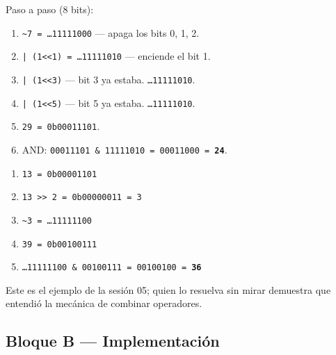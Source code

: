 \documentclass[12pt, oneside]{article}
\begin{document}
\begin{notaprofesor}
  Paso a paso (8 bits):
  \begin{enumerate}
    \item \texttt{\textasciitilde 7 = \ldots11111000} — apaga los bits 0, 1, 2.
    \item \texttt{| (1<<1) = \ldots11111010} — enciende el bit 1.
    \item \texttt{| (1<<3)} — bit 3 ya estaba. \texttt{\ldots11111010}.
    \item \texttt{| (1<<5)} — bit 5 ya estaba. \texttt{\ldots11111010}.
    \item \texttt{29 = 0b00011101}.
    \item AND: \texttt{00011101 \& 11111010 = 00011000 = \textbf{24}}.
  \end{enumerate}
\end{notaprofesor}

\begin{notaprofesor}
  \begin{enumerate}
    \item \texttt{13 = 0b00001101}
    \item \texttt{13 >> 2 = 0b00000011 = 3}
    \item \texttt{\textasciitilde 3 = \ldots11111100}
    \item \texttt{39 = 0b00100111}
    \item \texttt{\ldots11111100 \& 00100111 = 00100100 = \textbf{36}}
  \end{enumerate}
  Este es el ejemplo de la sesión 05; quien lo resuelva sin mirar demuestra
  que entendió la mecánica de combinar operadores.
\end{notaprofesor}

\subsection{Bloque B — Implementación}
\end{document}
